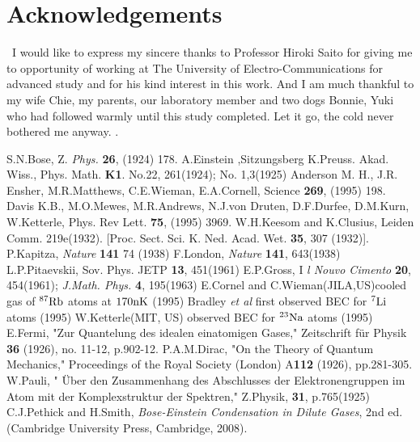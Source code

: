 \documentclass[12pt,a4paper]{jbook}
\begin{document}
\chapter*{Acknowledgements}
\ I would like to express my sincere thanks to Professor Hiroki Saito for
giving me to opportunity of working at The University of Electro-Communications
for advanced study and for his kind interest in this work.
And I am much thankful to my wife Chie, my parents, our laboratory member and two dogs Bonnie, Yuki who had followed
warmly until this study completed. Let it go, the cold never bothered me anyway. \cite{81}.

\begin{thebibliography}{81}
 S.N.Bose, Z. {\em Phys.} {\bf 26}, (1924) 178.
 A.Einstein ,Sitzungsberg K.Preuss. Akad. Wiss., Phys. Math. {\bf K1}. No.22, 261(1924); No. 1,3(1925)
 Anderson M. H., J.R. Ensher, M.R.Matthews, C.E.Wieman, E.A.Cornell, Science {\bf 269}, (1995) 198.
 Davis K.B., M.O.Mewes, M.R.Andrews, N.J.von Druten, D.F.Durfee, D.M.Kurn, W.Ketterle, Phys. Rev Lett. {\bf 75}, (1995) 3969.
 W.H.Keesom and K.Clusius, Leiden Comm. 219e(1932). [Proc. Sect. Sci. K. Ned. Acad. Wet. {\bf 35}, 307 (1932)].
 P.Kapitza, {\em Nature} {\bf 141} 74 (1938)
 F.London, {\em Nature} {\bf 141}, 643(1938)
 L.P.Pitaevskii, Sov. Phys. JETP {\bf 13}, 451(1961)
 E.P.Gross, I {\em l Nouvo Cimento} {\bf 20}, 454(1961); {\em J.Math. Phys.} {\bf 4}, 195(1963)
 E.Cornel and C.Wieman(JILA,US)cooled gas of $^{87} {\rm Rb}$ atoms at $170 {\rm nK}$ (1995)
 Bradley {\it et al} first observed BEC for $^{7} {\rm Li}$ atoms (1995)
 W.Ketterle(MIT, US) observed BEC for $^{23} {\rm Na}$ atoms (1995)
 E.Fermi, "Zur Quantelung des idealen einatomigen Gases," Zeitschrift f\"{u}r Physik {\bf 36} (1926), no. 11-12, p.902-12.
 P.A.M.Dirac, "On the Theory of Quantum Mechanics," Proceedings of the Royal Society (London) A{\bf 112} (1926), pp.281-305.
 W.Pauli, " \"{U}ber den Zusammenhang des Abschlusses der Elektronengruppen im Atom mit der Komplexstruktur der Spektren," Z.Physik, {\bf 31}, p.765(1925)
 C.J.Pethick and H.Smith, {\it Bose-Einstein Condensation in Dilute Gases}, 2nd ed. (Cambridge University Press, Cambridge, 2008).

\end{thebibliography}
\end{document}
